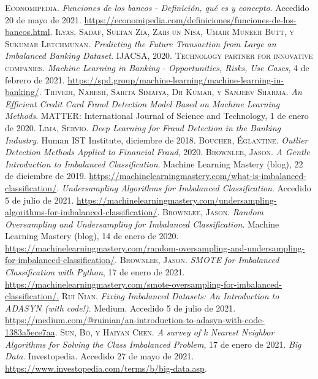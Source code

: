 \begin{thebibliography}{a}
	 \textsc{Economipedia}. \textit{Funciones de los bancos - Definici\'{o}n, qu\'{e} es y concepto}. Accedido 20 de mayo de 2021. \url{https://economipedia.com/definiciones/funciones-de-los-bancos.html}.
	 \textsc{Ilyas, Sadaf, Sultan Zia, Zaib un Nisa, Umair Muneer Butt, y Sukumar Letchmunan}. \textit{Predicting the Future Transaction from Large an Imbalanced Banking Dataset}. IJACSA, 2020.
	 \textsc{Technology partner for innovative companies}. \textit{Machine Learning in Banking - Opportunities, Risks, Use Cases}, 4 de febrero de 2021. \url{https://spd.group/machine-learning/machine-learning-in-banking/}.
	 \textsc{Trivedi, Naresh, Sarita Simaiya, Dr Kumar, y Sanjeev Sharma}. \textit{An Efficient Credit Card Fraud Detection Model Based on Machine Learning Methods}. MATTER: International Journal of Science and Technology, 1 de enero de 2020.
	 \textsc{Lima, Servio}. \textit{Deep Learning for Fraud Detection in the Banking Industry}. Human IST Institute, diciembre de 2018.
	 \textsc{Boucher, \'{E}glantine}. \textit{Outlier Detection Methods Applied to Financial Fraud}, 2020.
	 \textsc{Brownlee, Jason}. \textit{A Gentle Introduction to Imbalanced Classification}. Machine Learning Mastery (blog), 22 de diciembre de 2019. \url{https://machinelearningmastery.com/what-is-imbalanced-classification/}.
	 \textit{Undersampling Algorithms for Imbalanced Classification}. Accedido 5 de julio de 2021. \url{https://machinelearningmastery.com/undersampling-algorithms-for-imbalanced-classification/}.
	 \textsc{Brownlee, Jason}. \textit{Random Oversampling and Undersampling for Imbalanced Classification}. Machine Learning Mastery (blog), 14 de enero de 2020. \url{https://machinelearningmastery.com/random-oversampling-and-undersampling-for-imbalanced-classification/}.
	 \textsc{Brownlee, Jason}. \textit{SMOTE for Imbalanced Classification with Python}, 17 de enero de 2021. \url{https://machinelearningmastery.com/smote-oversampling-for-imbalanced-classification/.}
	 \textsc{Rui Nian}. \textit{Fixing Imbalanced Datasets: An Introduction to ADASYN (with code!)}. Medium. Accedido 5 de julio de 2021. \url{https://medium.com/@ruinian/an-introduction-to-adasyn-with-code-1383a5ece7aa}.
	 \textsc{Sun, Bo, y Haiyan Chen}. \textit{A survey of k Nearest Neighbor Algorithms for Solving the Class Imbalanced Problem}, 17 de enero de 2021.
	 \textit{Big Data}. Investopedia. Accedido 27 de mayo de 2021. \url{https://www.investopedia.com/terms/b/big-data.asp}.

\end{thebibliography}
